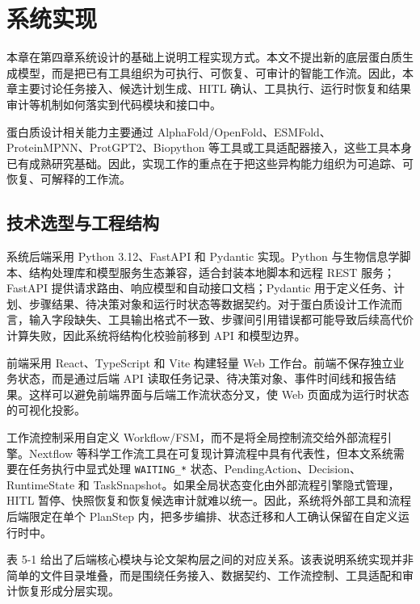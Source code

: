\section{系统实现}\label{ux7cfbux7edfux5b9eux73b0}

本章在第四章系统设计的基础上说明工程实现方式。本文不提出新的底层蛋白质生成模型，而是把已有工具组织为可执行、可恢复、可审计的智能工作流。因此，本章主要讨论任务接入、候选计划生成、HITL
确认、工具执行、运行时恢复和结果审计等机制如何落实到代码模块和接口中。

蛋白质设计相关能力主要通过
AlphaFold/OpenFold、ESMFold、ProteinMPNN、ProtGPT2、Biopython
等工具或工具适配器接入，这些工具本身已有成熟研究基础\citep{jumper2021alphafold, lin2023esmfold, dauparas2022proteinmpnn, ferruz2022protgpt2, ahdritz2024openfold, cock2009biopython}。因此，实现工作的重点在于把这些异构能力组织为可追踪、可恢复、可解释的工作流。

\subsection{技术选型与工程结构}\label{ux6280ux672fux9009ux578bux4e0eux5de5ux7a0bux7ed3ux6784}

系统后端采用 Python 3.12、FastAPI 和 Pydantic 实现。Python
与生物信息学脚本、结构处理库和模型服务生态兼容，适合封装本地脚本和远程
REST 服务；FastAPI 提供请求路由、响应模型和自动接口文档；Pydantic
用于定义任务、计划、步骤结果、待决策对象和运行时状态等数据契约。对于蛋白质设计工作流而言，输入字段缺失、工具输出格式不一致、步骤间引用错误都可能导致后续高代价计算失败，因此系统将结构化校验前移到
API 和模型边界。

前端采用 React、TypeScript 和 Vite 构建轻量 Web
工作台。前端不保存独立业务状态，而是通过后端 API
读取任务记录、待决策对象、事件时间线和报告结果。这样可以避免前端界面与后端工作流状态分叉，使
Web 页面成为运行时状态的可视化投影。

工作流控制采用自定义
Workflow/FSM，而不是将全局控制流交给外部流程引擎。Nextflow
等科学工作流工具在可复现计算流程中具有代表性\citep{ditommaso2017nextflow}，但本文系统需要在任务执行中显式处理
\texttt{WAITING\_*} 状态、PendingAction、Decision、RuntimeState 和
TaskSnapshot。如果全局状态变化由外部流程引擎隐式管理，HITL
暂停、快照恢复和恢复候选审计就难以统一。因此，系统将外部工具和流程后端限定在单个
PlanStep 内，把多步编排、状态迁移和人工确认保留在自定义运行时中。

表 5-1
给出了后端核心模块与论文架构层之间的对应关系。该表说明系统实现并非简单的文件目录堆叠，而是围绕任务接入、数据契约、工作流控制、工具适配和审计恢复形成分层实现。

